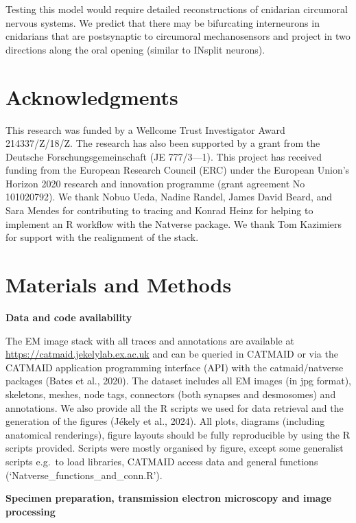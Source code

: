 \documentclass[
  11pt,
]{article}
\begin{document}
Testing this model would require detailed reconstructions of cnidarian
circumoral nervous systems. We predict that there may be bifurcating
interneurons in cnidarians that are postsynaptic to circumoral
mechanosensors and project in two directions along the oral opening
(similar to INsplit neurons).

\section{Acknowledgments}\label{acknowledgments}

This research was funded by a Wellcome Trust Investigator Award
214337/Z/18/Z. The research has also been supported by a grant from the
Deutsche Forschungsgemeinschaft (JE 777/3---1). This project has
received funding from the European Research Council (ERC) under the
European Union's Horizon 2020 research and innovation programme (grant
agreement No 101020792). We thank Nobuo Ueda, Nadine Randel, James David
Beard, and Sara Mendes for contributing to tracing and Konrad Heinz for
helping to implement an R workflow with the Natverse package. We thank
Tom Kazimiers for support with the realignment of the stack.

\section{Materials and Methods}\label{materials-and-methods}

\textbf{Data and code availability}

The EM image stack with all traces and annotations are available at
\url{https://catmaid.jekelylab.ex.ac.uk} and can be queried in CATMAID
or via the CATMAID application programming interface (API) with the
catmaid/natverse packages (Bates et al., 2020). The dataset includes all
EM images (in jpg format), skeletons, meshes, node tags, connectors
(both synapses and desmosomes) and annotations. We also provide all the
R scripts we used for data retrieval and the generation of the figures
(Jékely et al., 2024). All plots, diagrams (including anatomical
renderings), figure layouts should be fully reproducible by using the R
scripts provided. Scripts were mostly organised by figure, except some
generalist scripts e.g.~to load libraries, CATMAID access data and
general functions (`Natverse\_functions\_and\_conn.R').

\textbf{Specimen preparation, transmission electron microscopy and image
processing}
\end{document}
